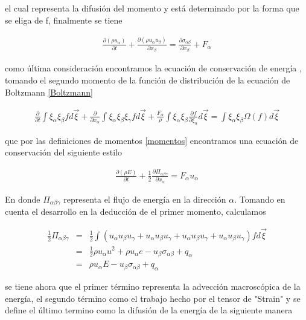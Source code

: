 \noindent el cual representa la difusión del momento y está determinado por la forma que se eliga de f, finalmente se tiene

\begin{eqnarray}
\boxed{\frac{\partial (\rho u_{\alpha})}{\partial t}+\frac{\partial(\rho u_{\alpha}u_{\beta})}{\partial x_{\beta}}=\frac{\partial \sigma_{\alpha\beta}}{\partial x_{\beta}}+F_{\alpha}}
\end{eqnarray}

\noindent como última consideración encontramos la ecuación de conservación de energía , tomando el segundo momento de la función de distribución de la ecuación de Boltzmann \eqref{Boltzmann}

\begin{eqnarray}
\frac{\partial}{\partial t}\int \xi_{\alpha}\xi_{\beta}f d\vec{\xi}+\frac{\partial}{\partial x_{\alpha}}\int \xi_{\alpha}\xi_{\beta}\xi_{\gamma}fd\vec{\xi}+\frac{F_{\alpha}}{\rho}\int \xi_{\alpha}\xi_{\beta}\frac{\partial f}{\partial \xi_{\alpha}}d\vec{\xi} = \int \xi_{\alpha}\xi_{\beta}\Omega(f)d\vec{\xi}
\end{eqnarray}

\noindent que por las definiciones de momentos \eqref{momentos} encontramos una ecuación de conservación del siguiente estilo 


\begin{eqnarray}
\frac{\partial (\rho E)}{\partial t} + \frac{1}{2}\frac{\partial \Pi_{\alpha\beta\gamma}}{\partial x_{\alpha}}=F_{\alpha}u_{\alpha}
\end{eqnarray}

En donde $\Pi_{\alpha\beta\gamma}$ representa el flujo de energía en la dirección $\alpha$. Tomando en cuenta el desarrollo en la deducción de el primer momento, calculamos 

\begin{eqnarray}
\frac{1}{2}\Pi_{\alpha\beta\gamma}&=&\frac{1}{2}\int (u_{\alpha}u_{\beta}u_{\gamma}+u_{\alpha}u_{\beta}u_{\gamma}+u_{\alpha}u_{\beta}u_{\gamma}+u_{\alpha}u_{\beta}u_{\gamma})fd\vec{\xi}\nonumber\\
&=&\frac{1}{2}\rho u_{\alpha} u^{2}+\rho u_{\alpha}e- u_{\beta}\sigma_{\alpha\beta}+q_{\alpha}\nonumber\\
&=&\rho u_{\alpha}E - u_{\beta}\sigma_{\alpha\beta} +q_{\alpha}
\end{eqnarray}

\noindent se tiene ahora que el primer término representa la advección macroscópica de la energía, el segundo término como el trabajo hecho por el tensor de "Strain" y se define el último termino como la difusión de la energía de la siguiente manera

